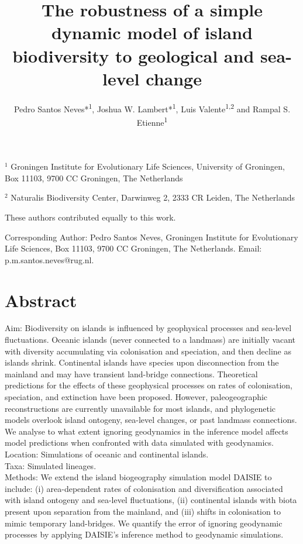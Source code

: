 \documentclass{article}
\title{The robustness of a simple dynamic model of island biodiversity to geological and sea-level change}
\author{Pedro Santos Neves*\textsuperscript{1}, Joshua W. Lambert*\textsuperscript{1}, Luis Valente\textsuperscript{1,2} and Rampal S. Etienne\textsuperscript{1}}
\date{}
\begin{document}
\maketitle

\noindent $^{1}$ Groningen Institute for Evolutionary Life Sciences, University of
Groningen, Box 11103, 9700 CC Groningen, The Netherlands

\noindent $^{2}$ Naturalis Biodiversity Center, Darwinweg 2, 2333 CR Leiden, The Netherlands 

\noindent * These authors contributed equally to this work.

\noindent Corresponding Author: Pedro Santos Neves, Groningen Institute for Evolutionary Life Sciences, Box 11103, 9700 CC Groningen, The Netherlands. Email: p.m.santos.neves@rug.nl.

\section*{Abstract}

Aim: Biodiversity on islands is influenced by geophysical processes and sea-level fluctuations. Oceanic islands (never connected to a landmass) are initially vacant with diversity accumulating via colonisation and speciation, and then decline as islands shrink. Continental islands have species upon disconnection from the mainland and may have transient land-bridge connections. Theoretical predictions for the effects of these geophysical processes on rates of colonisation, speciation, and extinction have been proposed. However, paleogeographic reconstructions are currently unavailable for most islands, and phylogenetic models overlook island ontogeny, sea-level changes, or past landmass connections. We analyse to what extent ignoring geodynamics in the inference model affects model predictions when confronted with data simulated with geodynamics. \\

\noindent Location: Simulations of oceanic and continental islands. \\

\noindent Taxa: Simulated lineages. \\

\noindent Methods: We extend the island biogeography simulation model DAISIE to include: (i) area-dependent rates of colonisation and diversification associated with island ontogeny and sea-level fluctuations, (ii) continental islands with biota present upon separation from the mainland, and (iii) shifts in colonisation to mimic temporary land-bridges. We quantify the error of ignoring geodynamic processes by applying DAISIE’s inference method to geodynamic simulations. \\
\end{document}
